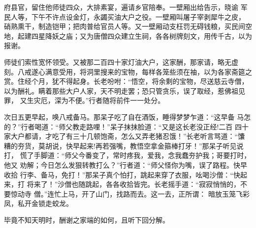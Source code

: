 府县官，留住他师徒四众，大排素宴，遍请乡官陪奉。一壁厢出给告示，晓谕
军民人等，下午不许点设金灯，永蠲买油大户之役。一壁厢叫屠子宰剥犀牛之皮，
硝熟熏干，制造铠甲；把肉普给官员人等。又一壁厢动支枉罚无碍钱粮，买民间空
地，起建四星降妖之庙；又为唐僧四众建立生祠，各各树牌刻文，用传千古，以为
报谢。

师徒们索性宽怀领受。又被那二百四十家灯油大户，这家酬，那家请，略无虚
刻。八戒遂心满意受用，将洞里搜来的宝物，每样各笼些须在袖，以为各家斋筵之
赏。住经个月，犹不得起身。长老吩咐：“悟空，将余剩的宝物，尽送慈云寺僧，
以为酬礼。瞒着那些大户人家，天不明走罢；恐只管贪乐，误了取经，惹佛祖见罪，
又生灾厄，深为不便。”行者随将前件一一处分。

次日五更早起，唤八戒备马。那呆子吃了自在酒饭，睡得梦梦乍道：“这早备
马怎的？”行者喝道：“师父教走路哩！”呆子抹抹脸道：“又是这长老没正经!二百
四十家大户都请，才吃了有三十几顿饱斋，怎么又弄老猪忍饿！”长老听言骂道：“馕
糟的夯货，莫胡说，快早起来!再若强嘴，教悟空拿金箍棒打牙！”那呆子听见说打，
慌了手脚道：“师父今番变了，常时疼我，爱我，念我蠢夯护我；哥要打时，他又
劝解；今日怎么发狠转教打么？”行者道：“师父怪你为嘴，误了路程。快早收拾
行李、备马，免打！”那呆子真个怕打，跳起来穿了衣服，吆喝沙僧：“快起来，打
将来了！”沙僧也随跳起，各各收拾皆完。长老摇手道：“寂寂悄悄的，不要惊动寺
僧。”连忙上马，开了山门，找路而去。这一去，正所谓：
暗放玉笼飞彩凤，私开金锁走蛟龙。

毕竟不知天明时，酬谢之家端的如何，且听下回分解。